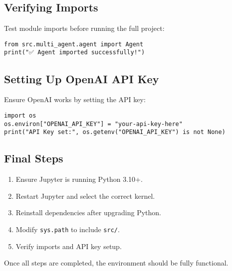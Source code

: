 \subsection{Verifying Imports}
Test module imports before running the full project:
\begin{verbatim}
from src.multi_agent.agent import Agent
print("✅ Agent imported successfully!")
\end{verbatim}

\subsection{Setting Up OpenAI API Key}
Ensure OpenAI works by setting the API key:
\begin{verbatim}
import os
os.environ["OPENAI_API_KEY"] = "your-api-key-here"
print("API Key set:", os.getenv("OPENAI_API_KEY") is not None)
\end{verbatim}

\subsection{Final Steps}
\begin{enumerate}
    \item Ensure Jupyter is running Python 3.10+.
    \item Restart Jupyter and select the correct kernel.
    \item Reinstall dependencies after upgrading Python.
    \item Modify \texttt{sys.path} to include \texttt{src/}.
    \item Verify imports and API key setup.
\end{enumerate}

Once all steps are completed, the environment should be fully functional.
